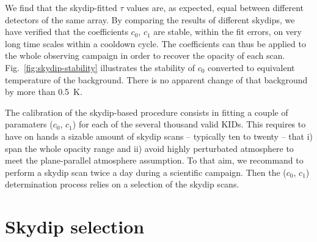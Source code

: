 We find that the skydip-fitted $\tau$ values are, as expected,
equal between different detectors of the same array. By comparing the
results of different skydips, we have verified that the
coefficients $c_0$, $c_1$ are stable, within the fit errors, on very
long time scales within a cooldown cycle. The coefficients can thus be
applied to the whole observing campaign in order to recover the
opacity of each scan. Fig.~\ref{fig:skydip-stability} illustrates the
stability of $c_0$ converted to equivalent temperature of the
background. There is no apparent change of that background by more
than 0.5~K.




The calibration of the skydip-based procedure consists in fitting a couple of paramaters
($c_0$, $c_1$) for each of the several thousand valid KIDs. This
requires to have on hands a sizable amount of skydip scans --
typically ten to twenty -- that i) span the whole opacity range and
ii) avoid highly perturbated atmosphere to meet the plane-parallel
atmosphere assumption. To that aim, we recommand to perform a skydip
scan twice a day during a scientific campaign. Then the ($c_0$, $c_1$)
determination process relies on a selection of the skydip scans.




\section{Skydip selection}%
\label{se:skydip-selection}

